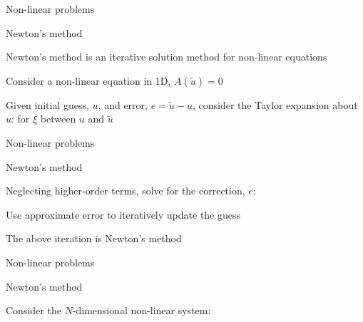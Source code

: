 \documentclass[18pt,xcolor=table]{beamer}
\begin{document}
\begin{frame}{Non-linear problems}
\begin{block}{Newton's method}
\bit
\item Newton's method is an iterative solution method for non-linear equations
\item Consider a non-linear equation in 1D, $A(\tilde{u}) = 0$
\item Given initial guess, $u$, and error, $e = \tilde{u} - u$, consider the Taylor expansion about $u$:
for $\xi$ between $u$ and $\tilde{u}$
\eit
\end{block}
\end{frame}

\begin{frame}{Non-linear problems}
\begin{block}{Newton's method}
\bit
\item Neglecting higher-order terms, solve for the correction, $e$:
\item Use approximate error to iteratively update the guess
\item The above iteration is Newton's method
\eit
\end{block}
\end{frame}

\begin{frame}{Non-linear problems}
\begin{block}{Newton's method}
\bit
\item Consider the $N$-dimensional non-linear system:
\eit
\end{block}
\end{frame}
\end{document}
